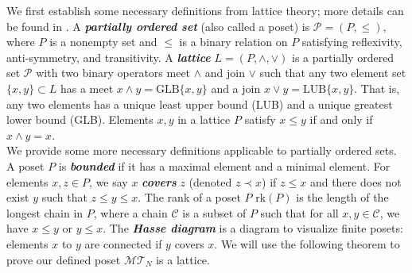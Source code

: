\documentclass{article}
\newtheorem{definition}{Definition}
\begin{document}
We first establish some necessary definitions from lattice theory; more details can be found in \cite{nation1998notes}. A \textit{\textbf{partially ordered set}} (also called a poset) is $\mathcal{P} = (P, \leq)$, where $P$ is a nonempty set and $\leq$ is a binary relation on $P$ satisfying reflexivity, anti-symmetry, and transitivity. A \textit{\textbf{lattice}} $L=(P,\wedge, \vee)$ is a partially ordered set $\mathcal{P}$ with two binary operators meet $\wedge$ and join $\vee$ such that any two element set $\{x, y\} \subset L$ has a meet $x \wedge y= \text{GLB}\{x,y\}$ and a join $x \vee y=\text{LUB}\{x,y\}$. That is, any two elements has a unique least upper bound (LUB) and a unique greatest lower bound (GLB). Elements $x,y$ in a lattice $P$ satisfy $x\leq y$ if and only if $x \wedge y=x$. \\ 




We provide some more necessary definitions applicable to partially ordered sets. A poset $P$ is \textit{\textbf{bounded}} if it has a maximal element and a minimal element. For elements $x,z \in P$, we say $x$ \textit{\textbf{covers}} $z$ (denoted $z \prec x$) if $z \leq x$ and there does not exist $y$ such that $z \leq y \leq x$. The rank of a poset $P$ rk$(P)$ is the length of the longest chain in $P$, where a chain $\mathcal{C}$ is a subset of $P$ such that for all $x,y \in \mathcal{C}$, we have $x\leq y$ or $y\leq x$. The \textit{\textbf{Hasse diagram}} is a diagram to visualize finite posets: elements $x$ to $y$ are connected if $y$ covers $x$. We will use the following theorem to prove our defined poset $\mathcal{MT}_N$ is a lattice.
\end{document}
